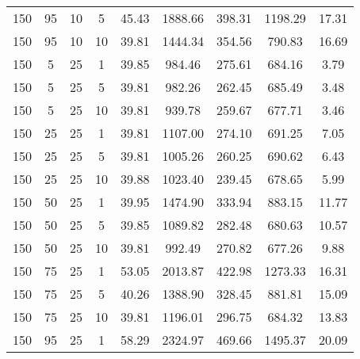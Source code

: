 \begin{table}[h]
\begin{tabular}{cccc|c|c|c|c|c}
150 & 95 & 10 & 5 & \cellcolor{gray!1}45.43 & \cellcolor{gray!1}1888.66 & \cellcolor{gray!1}398.31 & \cellcolor{gray!1}1198.29 & 17.31\\
150 & 95 & 10 & 10 & \cellcolor{gray!50}39.81 & \cellcolor{gray!1}1444.34 & \cellcolor{gray!1}354.56 & \cellcolor{gray!15}790.83 & 16.69\\
150 & 5 & 25 & 1 & \cellcolor{gray!50}39.85 & \cellcolor{gray!40}984.46 & \cellcolor{gray!6}275.61 & \cellcolor{gray!48}684.16 & 3.79\\
150 & 5 & 25 & 5 & \cellcolor{gray!50}39.81 & \cellcolor{gray!41}982.26 & \cellcolor{gray!21}262.45 & \cellcolor{gray!48}685.49 & 3.48\\
150 & 5 & 25 & 10 & \cellcolor{gray!50}39.81 & \cellcolor{gray!49}939.78 & \cellcolor{gray!24}259.67 & \cellcolor{gray!50}677.71 & 3.46\\
150 & 25 & 25 & 1 & \cellcolor{gray!50}39.81 & \cellcolor{gray!17}1107.00 & \cellcolor{gray!7}274.10 & \cellcolor{gray!46}691.25 & 7.05\\
150 & 25 & 25 & 5 & \cellcolor{gray!50}39.81 & \cellcolor{gray!36}1005.26 & \cellcolor{gray!23}260.25 & \cellcolor{gray!46}690.62 & 6.43\\
150 & 25 & 25 & 10 & \cellcolor{gray!50}39.88 & \cellcolor{gray!33}1023.40 & \cellcolor{gray!47}239.45 & \cellcolor{gray!50}678.65 & 5.99\\
150 & 50 & 25 & 1 & \cellcolor{gray!49}39.95 & \cellcolor{gray!1}1474.90 & \cellcolor{gray!1}333.94 & \cellcolor{gray!1}883.15 & 11.77\\
150 & 50 & 25 & 5 & \cellcolor{gray!50}39.85 & \cellcolor{gray!20}1089.82 & \cellcolor{gray!1}282.48 & \cellcolor{gray!49}680.63 & 10.57\\
150 & 50 & 25 & 10 & \cellcolor{gray!50}39.81 & \cellcolor{gray!39}992.49 & \cellcolor{gray!11}270.82 & \cellcolor{gray!50}677.26 & 9.88\\
150 & 75 & 25 & 1 & \cellcolor{gray!1}53.05 & \cellcolor{gray!1}2013.87 & \cellcolor{gray!1}422.98 & \cellcolor{gray!1}1273.33 & 16.31\\
150 & 75 & 25 & 5 & \cellcolor{gray!46}40.26 & \cellcolor{gray!1}1388.90 & \cellcolor{gray!1}328.45 & \cellcolor{gray!1}881.81 & 15.09\\
150 & 75 & 25 & 10 & \cellcolor{gray!50}39.81 & \cellcolor{gray!1}1196.01 & \cellcolor{gray!1}296.75 & \cellcolor{gray!48}684.32 & 13.83\\
150 & 95 & 25 & 1 & \cellcolor{gray!1}58.29 & \cellcolor{gray!1}2324.97 & \cellcolor{gray!1}469.66 & \cellcolor{gray!1}1495.37 & 20.09\\

\end{tabular}
\end{table}
